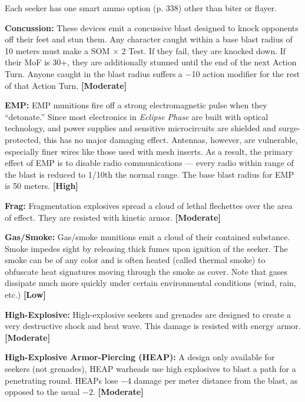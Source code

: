Each seeker has one smart ammo option (p. 338) other than biter or flayer. 

\textbf{Concussion:} These devices emit a concussive blast designed to knock opponents off their feet and stun them. Any character caught within a base blast radius of 10 meters must make a SOM $\times$ 2 Test. If they fail, they are knocked down. If their MoF is 30+, they are additionally stunned until the end of the next Action Turn. Anyone caught in the blast radius suffers a $-$10 action modifier for the rest of that Action Turn. \textbf{[Moderate]} 

\textbf{EMP:} EMP munitions fire off a strong electromagnetic pulse when they ``detonate.'' Since most electronics in \emph{Eclipse Phase} are built with optical technology, and power supplies and sensitive microcircuits are shielded and surge-protected, this has no major damaging effect. Antennas, however, are vulnerable, especially finer wires like those used with mesh inserts. As a result, the primary effect of EMP is to disable radio communications --- every radio within range of the blast is reduced to 1/10th the normal range. The base blast radius for EMP is 50 meters. \textbf{[High]} 

\textbf{Frag:} Fragmentation explosives spread a cloud of lethal flechettes over the area of effect. They are resisted with kinetic armor. \textbf{[Moderate]} 

\textbf{Gas/Smoke:} Gas/smoke munitions emit a cloud of their contained substance. Smoke impedes sight by releasing thick fumes upon ignition of the seeker. The smoke can be of any color and is often heated (called thermal smoke) to obfuscate heat signatures moving through the smoke as cover. Note that gases dissipate much more quickly under certain environmental conditions (wind, rain, etc.) \textbf{[Low]} 

\textbf{High-Explosive:} High-explosive seekers and grenades are designed to create a very destructive shock and heat wave. This damage is resisted with energy armor. \textbf{[Moderate]} 

\textbf{High-Explosive Armor-Piercing (HEAP):} A design only available for seekers (not grenades), HEAP warheads use high explosives to blast a path for a penetrating round. HEAPs lose $-$4 damage per meter distance from the blast, as opposed to the usual $-$2. \textbf{[Moderate]} 

